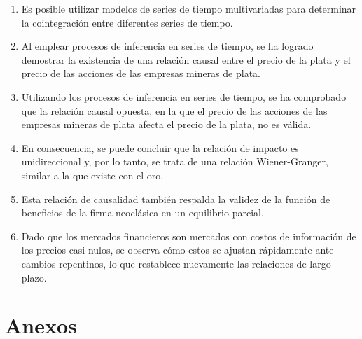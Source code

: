 \documentclass[11pt]{article}
\begin{document}
\begin{flushleft}
    \begin{enumerate}
        \item Es posible utilizar modelos de series de tiempo multivariadas para determinar la cointegración entre diferentes series de tiempo.
        \item Al emplear procesos de inferencia en series de tiempo, se ha logrado demostrar la existencia de una relación causal entre el precio de la plata y el precio de las acciones de las empresas mineras de plata.
        \item Utilizando los procesos de inferencia en series de tiempo, se ha comprobado que la relación causal opuesta, en la que el precio de las acciones de las empresas mineras de plata afecta el precio de la plata, no es válida.
        \item En consecuencia, se puede concluir que la relación de impacto es unidireccional y, por lo tanto, se trata de una relación Wiener-Granger, similar a la que existe con el oro.
        \item Esta relación de causalidad también respalda la validez de la función de beneficios de la firma neoclásica en un equilibrio parcial.
        \item Dado que los mercados financieros son mercados con costos de información de los precios casi nulos, se observa cómo estos se ajustan rápidamente ante cambios repentinos, lo que restablece nuevamente las relaciones de largo plazo.
    \end{enumerate}
\end{flushleft}

\newpage

\medskip

 

\newpage

\section{Anexos}
\end{document}
